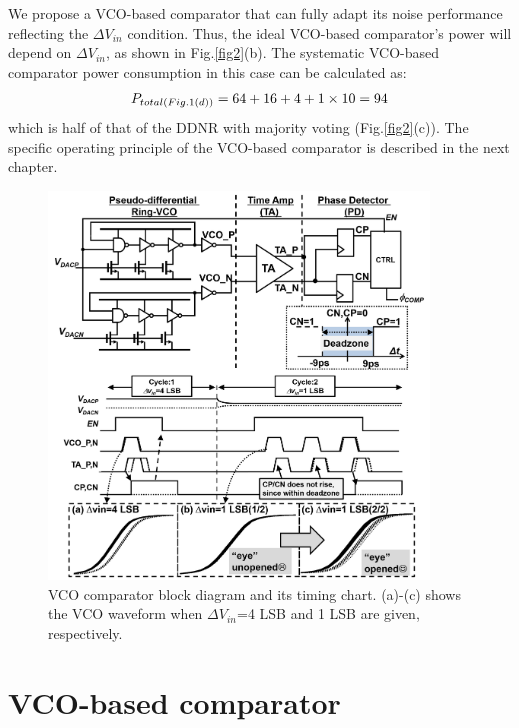 \documentclass[journal]{IEEEtran}
\begin{document}
We propose a VCO-based comparator that can fully adapt its noise performance reflecting the $\Delta V_{in}$ condition. Thus, the ideal VCO-based comparator's power will depend on $\Delta V_{in}$, as shown in Fig.\ref{fig2}(b). The systematic VCO-based comparator power consumption in this case can be calculated as:
\begin{eqnarray}
    \centering
    P_{total(Fig.1(d))} = 64+16+4+1\times 10=94
    \label{ddnr}
\end{eqnarray}
which is half of that of the DDNR with majority voting (Fig.\ref{fig2}(c)). 
The specific operating principle of the VCO-based comparator is described in the next chapter.


\begin{figure}[!]
\centering
 \includegraphics[width=0.9\textwidth]{figs/full.png}
  \caption{VCO comparator block diagram and its timing chart. (a)-(c) shows the VCO waveform when $\Delta V_{in}$=4 LSB and 1 LSB are given, respectively.}
  \label{schema}
\end{figure}

\section{VCO-based comparator}
\end{document}
